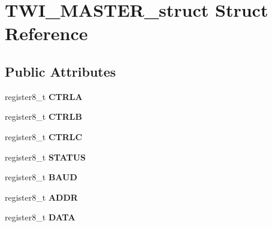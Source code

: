 \hypertarget{struct_t_w_i___m_a_s_t_e_r__struct}{}\section{T\+W\+I\+\_\+\+M\+A\+S\+T\+E\+R\+\_\+struct Struct Reference}
\label{struct_t_w_i___m_a_s_t_e_r__struct}
\subsection*{Public Attributes}
\begin{DoxyCompactItemize}
\item 
register8\+\_\+t {\bfseries C\+T\+R\+LA}\hypertarget{struct_t_w_i___m_a_s_t_e_r__struct_ac4c9558296f78de70aea7220a369f8d0}{}\label{struct_t_w_i___m_a_s_t_e_r__struct_ac4c9558296f78de70aea7220a369f8d0}

\item 
register8\+\_\+t {\bfseries C\+T\+R\+LB}\hypertarget{struct_t_w_i___m_a_s_t_e_r__struct_a6bec6f15f02825dbd6eeb1b47b9f5c59}{}\label{struct_t_w_i___m_a_s_t_e_r__struct_a6bec6f15f02825dbd6eeb1b47b9f5c59}

\item 
register8\+\_\+t {\bfseries C\+T\+R\+LC}\hypertarget{struct_t_w_i___m_a_s_t_e_r__struct_a8294d4047384a14284395f25c4c8e1fa}{}\label{struct_t_w_i___m_a_s_t_e_r__struct_a8294d4047384a14284395f25c4c8e1fa}

\item 
register8\+\_\+t {\bfseries S\+T\+A\+T\+US}\hypertarget{struct_t_w_i___m_a_s_t_e_r__struct_aea15764b94901a2cd5664d75abdf1388}{}\label{struct_t_w_i___m_a_s_t_e_r__struct_aea15764b94901a2cd5664d75abdf1388}

\item 
register8\+\_\+t {\bfseries B\+A\+UD}\hypertarget{struct_t_w_i___m_a_s_t_e_r__struct_acaaf4bbb5de65800b100ec77d9b743c8}{}\label{struct_t_w_i___m_a_s_t_e_r__struct_acaaf4bbb5de65800b100ec77d9b743c8}

\item 
register8\+\_\+t {\bfseries A\+D\+DR}\hypertarget{struct_t_w_i___m_a_s_t_e_r__struct_a449768ab77f1af722867a7a936227c91}{}\label{struct_t_w_i___m_a_s_t_e_r__struct_a449768ab77f1af722867a7a936227c91}

\item 
register8\+\_\+t {\bfseries D\+A\+TA}\hypertarget{struct_t_w_i___m_a_s_t_e_r__struct_ad8a09a564ae6ff6ad6038dd1b6b29131}{}\label{struct_t_w_i___m_a_s_t_e_r__struct_ad8a09a564ae6ff6ad6038dd1b6b29131}

\end{DoxyCompactItemize}


